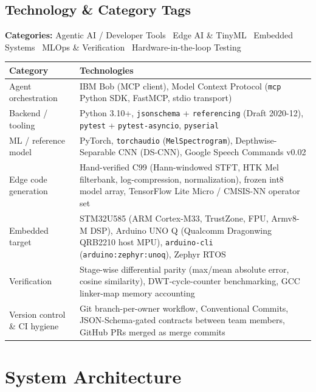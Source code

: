 \documentclass[11pt,a4paper]{article}
\begin{document}
\subsection{Technology \& Category Tags}

\begin{tagbox}
\textbf{Categories:} Agentic AI / Developer Tools \textbullet\ Edge AI \& TinyML
\textbullet\ Embedded Systems \textbullet\ MLOps \& Verification \textbullet\
Hardware-in-the-loop Testing
\end{tagbox}

\vspace{0.3cm}
\begin{longtable}{@{}p{3.6cm}p{10.8cm}@{}}
\toprule
\textbf{Category} & \textbf{Technologies} \\
\midrule
\endhead
Agent orchestration & IBM Bob (MCP client), Model Context Protocol (\texttt{mcp} Python SDK, FastMCP, stdio transport) \\
\addlinespace
Backend / tooling & Python 3.10+, \texttt{jsonschema} + \texttt{referencing} (Draft 2020-12), \texttt{pytest} + \texttt{pytest-asyncio}, \texttt{pyserial} \\
\addlinespace
ML / reference model & PyTorch, \texttt{torchaudio} (\texttt{MelSpectrogram}), Depthwise-Separable CNN (DS-CNN), Google Speech Commands v0.02 \\
\addlinespace
Edge code generation & Hand-verified C99 (Hann-windowed STFT, HTK Mel filterbank, log-compression, normalization), frozen int8 model array, TensorFlow Lite Micro / CMSIS-NN operator set \\
\addlinespace
Embedded target & STM32U585 (ARM Cortex-M33, TrustZone, FPU, Armv8-M DSP), Arduino UNO Q (Qualcomm Dragonwing QRB2210 host MPU), \texttt{arduino-cli} (\texttt{arduino:zephyr:unoq}), Zephyr RTOS \\
\addlinespace
Verification & Stage-wise differential parity (max/mean absolute error, cosine similarity), DWT-cycle-counter benchmarking, GCC linker-map memory accounting \\
\addlinespace
Version control \& CI hygiene & Git branch-per-owner workflow, Conventional Commits, JSON-Schema-gated contracts between team members, GitHub PRs merged as merge commits \\
\bottomrule
\end{longtable}

\newpage
\section{System Architecture}
\label{sec:architecture}
\end{document}
